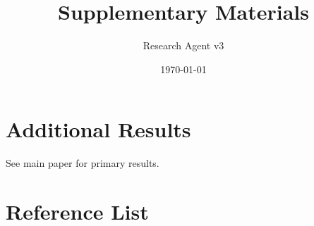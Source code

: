 \documentclass[11pt,a4paper]{article}
\title{Supplementary Materials}
\author{Research Agent v3}
\date{\today}
\begin{document}
\maketitle

\section{Additional Results}

See main paper for primary results.

\section{Reference List}

\begin{enumerate}
\end{enumerate}
\end{document}
